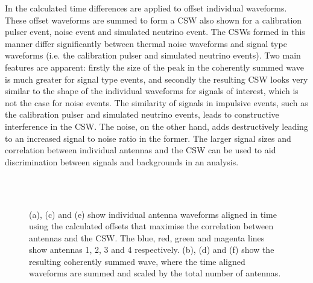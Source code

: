 In  the calculated time differences are applied to offset individual waveforms. These offset waveforms are summed to form a CSW also shown for a calibration pulser event, noise event and simulated neutrino event. The CSWs formed in this manner differ significantly between thermal noise waveforms and signal type waveforms (i.e. the calibration pulser and simulated neutrino events). Two main features are apparent: firstly the size of the peak in the coherently summed wave is much greater for signal type events, and secondly the resulting CSW looks very similar to the shape of the individual waveforms for signals of interest, which is not the case for noise events. The similarity of signals in impulsive events, such as the calibration pulser and simulated neutrino events, leads to constructive interference in the CSW. The noise, on the other hand, adds destructively leading to an increased  signal to noise ratio in the former. The larger signal sizes and correlation between individual antennas and the CSW can be used to aid discrimination between signals and backgrounds in an analysis.


\begin{figure}[htpb]
  \hfill
  \\
  \hfill
  \\
  \hfill
  \caption{(a), (c) and (e) show individual antenna waveforms aligned in time using the calculated offsets that maximise the correlation between antennas and the CSW. The blue, red, green and magenta lines show antennas 1, 2, 3 and 4 respectively. (b), (d) and (f) show the resulting coherently summed wave, where the time aligned waveforms are summed and scaled by the total number of antennas.} 
  \label{fig:analysis:Reconstruction:CSW-Example}
\end{figure}



